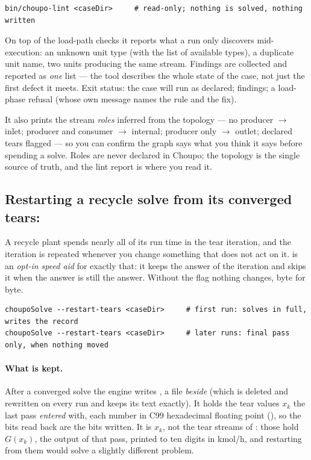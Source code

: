 \documentclass[11pt,a4paper]{article}
\begin{document}
\begin{lstlisting}
bin/choupo-lint <caseDir>     # read-only; nothing is solved, nothing written
\end{lstlisting}

On top of the load-path checks it reports what a run only discovers
mid-execution: an unknown unit type (with the list of available types),
a duplicate unit name, two units producing the same stream.  Findings
are collected and reported as \emph{one} list --- the tool describes the
whole state of the case, not just the first defect it meets.  Exit
status:  the case will run as declared;  findings;
 a load-phase refusal (whose own message names the rule and the
fix).

It also prints the stream \emph{roles} inferred from the topology --- no
producer $\rightarrow$ inlet; producer and consumer $\rightarrow$
internal; producer only $\rightarrow$ outlet; declared tears flagged ---
so you can confirm the graph says what you think it says before
spending a solve.  Roles are never declared in Choupo; the topology is
the single source of truth, and the lint report is where you read it.

\subsection{Restarting a recycle solve from its converged tears: }\label{sec:restart-tears}

A recycle plant spends nearly all of its run time in the tear iteration,
and the iteration is repeated whenever you change something that does not
act on it.   is an \emph{opt-in speed aid} for
exactly that: it keeps the answer of the iteration and skips it when the
answer is still the answer.  Without the flag nothing changes, byte for
byte.

\begin{lstlisting}
choupoSolve --restart-tears <caseDir>     # first run: solves in full, writes the record
choupoSolve --restart-tears <caseDir>     # later runs: final pass only, when nothing moved
\end{lstlisting}

\paragraph{What is kept.}  After a converged solve the engine writes
, a file \emph{beside} 
(which is deleted and rewritten on every run and keeps its text exactly).
It holds the tear values $x_k$ the last pass \emph{entered} with, each number
in C99 hexadecimal floating point (), so the bits
read back are the bits written.  It is $x_k$, not the tear streams of
: those hold $G(x_k)$, the output of that pass, printed to ten
digits in kmol/h, and restarting from them would solve a slightly different
problem.
\end{document}
